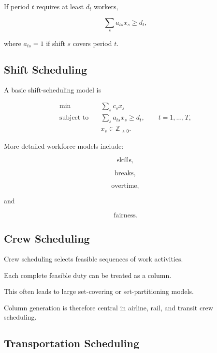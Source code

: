 If period \(t\) requires at least \(d_t\) workers,

\[
\boxed{
\sum_s
a_{ts}x_s
\geq
d_t,
}
\]

where \(a_{ts}=1\) if shift \(s\) covers period \(t\).

\subsection{Shift Scheduling}
\label{subsec:shift-scheduling}

A basic shift-scheduling model is

\[
\boxed{
\begin{aligned}
\min
\quad&
\sum_s
c_sx_s
\\
\text{subject to}
\quad&
\sum_s
a_{ts}x_s
\geq
d_t,
\qquad
t=1,\ldots,T,
\\
&
x_s\in\mathbb{Z}_{\geq0}.
\end{aligned}
}
\]

More detailed workforce models include:

\[
\boxed{
\text{skills},
}
\]

\[
\boxed{
\text{breaks},
}
\]

\[
\boxed{
\text{overtime},
}
\]

and

\[
\boxed{
\text{fairness}.
}
\]

\subsection{Crew Scheduling}
\label{subsec:crew-scheduling}

Crew scheduling selects feasible sequences of work activities.

Each complete feasible duty can be treated as a column.

This often leads to large set-covering or set-partitioning models.

Column generation is therefore central in airline, rail, and transit crew
scheduling.

\subsection{Transportation Scheduling}
\label{subsec:transportation-scheduling}

